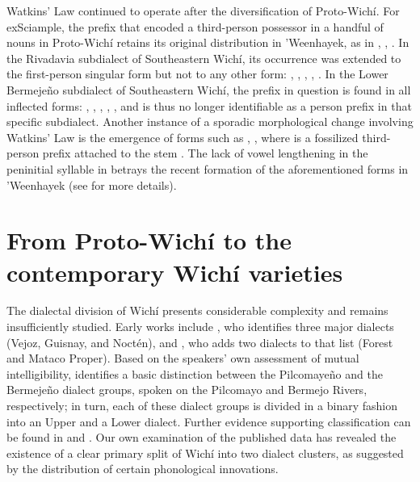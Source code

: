 Watkins’ Law continued to operate after the diversification of Proto-Wichí. For exSciample, the prefix  that encoded a third-person possessor in a handful of nouns in Proto-Wichí retains its original distribution in ’Weenhayek, as in , ,  \citep[62, 294, 331]{KC16}. In the Rivadavia subdialect of Southeastern Wichí, its occurrence was extended to the first-person singular form but not to any other form: , , , ,  \citep[69]{JT09-th}. In the Lower Bermejeño subdialect of Southeastern Wichí, the prefix in question is found in all inflected forms: , , , ,  \citep[147]{VN14}, and is thus no longer identifiable as a person prefix in that specific subdialect. Another instance of a sporadic morphological change involving Watkins’ Law is the emergence of forms such as ,  \citep[221]{KC16}, where  is a fossilized third-person prefix attached to the stem  \citep[93]{KC16}. The lack of vowel lengthening in the peninitial syllable in  betrays the recent formation of the aforementioned forms in ’Weenhayek (see  for more details). 

\section{From Proto-Wichí to the contemporary Wichí varieties}\label{wi-dialects}

The dialectal division of Wichí presents considerable complexity and remains insufficiently studied. Early works include \citet[36]{AT61}, who identifies three major dialects (Vejoz, Guisnay, and Noctén), and \citet{EN68}, who adds two dialects to that list (Forest and Mataco Proper). Based on the speakers’ own assessment of mutual intelligibility, \citet[27]{VN14} identifies a basic distinction between the Pilcomayeño and the Bermejeño dialect groups, spoken on the Pilcomayo and Bermejo Rivers, respectively; in turn, each of these dialect groups is divided in a binary fashion into an Upper and a Lower dialect. Further evidence supporting  classification can be found in \citet{VN20} and \citet{VN-MA-21}. Our own examination of the published data has revealed the existence of a clear primary split of Wichí into two dialect clusters, as suggested by the distribution of certain phonological innovations.

